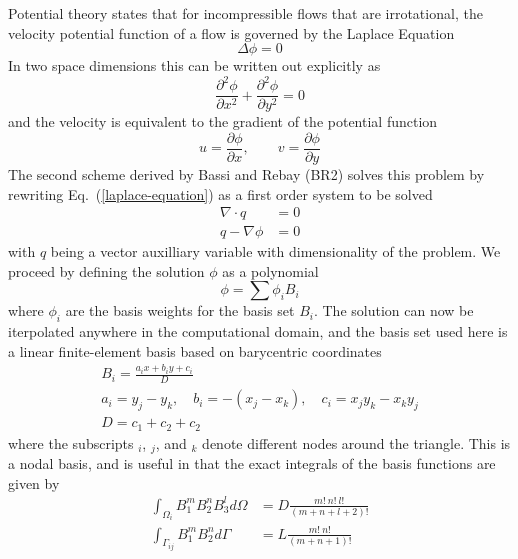 \documentclass[a4paper]{article}
\newcommand{\eref}[1]{Eq.~(\ref{#1})}
\newcommand{\dint}[1]{\int_{\Omega_i}{#1 d\Omega}}
\newcommand{\sint}[1]{\int_{\Gamma_{ij}}{#1 d\Gamma}}
\begin{document}
Potential theory states that for incompressible flows that are irrotational, the
velocity potential function of a flow is governed by the Laplace Equation
\begin{equation}
  \Delta \phi = 0
  \label{laplace-equation}
\end{equation}
In two space dimensions this can be written out explicitly as
\begin{equation}
  \frac{\partial^2 \phi}{\partial x^2} 
  + \frac{\partial^2 \phi}{\partial y^2} = 0
  \label{2d-laplace}
\end{equation}
and the velocity is equivalent to the gradient of the potential function
\begin{equation}
  u = \frac{\partial \phi}{\partial x}, \qquad v = \frac{\partial \phi}{\partial y}
  \label{uv-def}
\end{equation}
The second scheme derived by Bassi and Rebay (BR2) solves this problem by
rewriting \eref{laplace-equation} as a first order system to be solved 
\begin{align}
  \nabla \cdot q &= 0 \\
  q - \nabla \phi &= 0
  \label{first-order-sys}
\end{align}
with $q$ being a vector auxilliary variable with dimensionality of the problem.
We proceed by defining the solution $\phi$ as a polynomial \begin{equation}
  \phi = \sum{\phi_i B_i}
  \label{fem-soln}
\end{equation}
where $\phi_i$ are the basis weights for the basis set $B_i$.  The solution can
now be iterpolated anywhere in the computational domain, and the basis set used
here is a linear finite-element basis based on barycentric coordinates
\begin{equation}
  \begin{gathered}
    B_i = \frac{a_i x + b_i y + c_i}{D} \\
    a_i = y_j-y_k, \quad 
    b_i = -(x_j - x_k), \quad
    c_i = x_j y_k - x_k y_j  \\
    D = c_1 + c_2 + c_2
  \end{gathered}
  \label{basis}
\end{equation}
where the subscripts $_i$, $_j$, and $_k$ denote different nodes around the
triangle. This is a nodal basis, and is useful in that the exact integrals of
the basis functions are given by
\begin{align}
  \dint{B_1^{m}B_2^{n}B_3^{l}} &= D \frac{m!\ n!\ l!}{(m+n+l+2)!}
  \label{dom-integral-def} \\
  \sint{B_1^{m}B_2^{n}} &= L \frac{m!\ n!}{(m+n+1)!}
  \label{edge-integral-def}
\end{align}
\end{document}
